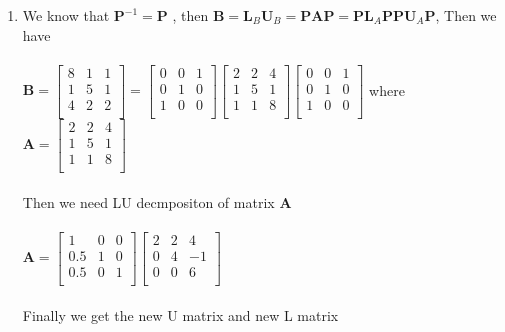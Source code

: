 \documentclass[english,onecolumn]{IEEEtran}
\begin{document}
\begin{enumerate}
    
    \item We know that $\mathbf{P}^{-1}=\mathbf{P}$ , then
    $\mathbf{B}=\mathbf{L}_{B}\mathbf{U}_{B}=\mathbf{P}\mathbf{A}\mathbf{P}=\mathbf{P}\mathbf{L}_{A}\mathbf{P}\mathbf{P}\mathbf{U}_{A}\mathbf{P}$,\quad
    Then we have \\\\
    $\mathbf{B}=\begin{bmatrix}
    8 & 1 & 1\\
    1 & 5 & 1\\
    4 & 2 & 2\\
    \end{bmatrix}
    =\begin{bmatrix}
    0 & 0 & 1\\
    0 & 1 & 0\\
    1 & 0 & 0\\
    \end{bmatrix}
    \begin{bmatrix}
    2 & 2 & 4\\
    1 & 5 & 1\\
    1 & 1 & 8\\
    \end{bmatrix}
    \begin{bmatrix}
    0 & 0 & 1\\
    0 & 1 & 0\\
    1 & 0 & 0\\
    \end{bmatrix}
    $\qquad
    where $\mathbf{A}=\begin{bmatrix}
    2 & 2 & 4\\
    1 & 5 & 1\\
    1 & 1 & 8\\
    \end{bmatrix}$\\\\
    Then we need LU decmpositon of matrix $\mathbf{A}$\\\\
    $\mathbf{A}=\begin{bmatrix}
    1 & 0 & 0\\
    0.5 & 1 & 0\\
    0.5 & 0 & 1\\
    \end{bmatrix}
    \begin{bmatrix}
    2 & 2 & 4\\
    0 & 4 & -1\\
    0 & 0 & 6\\
    \end{bmatrix}
    $
    \\\\
    Finally we get the new U matrix and new L matrix\\\\
    

\end{enumerate}
\end{document}
